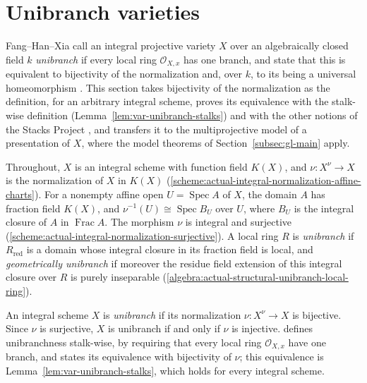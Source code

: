 \section{Unibranch varieties}\label{sec:var-unibranch}

Fang--Han--Xia call an integral projective variety $X$ over an algebraically closed field $k$
\emph{unibranch} if every local ring $\mathcal O_{X,x}$ has one branch, and state that this is
equivalent to bijectivity of the normalization \cite[Tags~0C37, 0C3B]{Stacks} and, over $k$, to
its being a universal homeomorphism \cite[\S1.1 and Lemma~8.1]{FHX}. This section takes
bijectivity of the normalization as the definition, for an arbitrary integral scheme, proves its
equivalence with the stalk-wise definition (Lemma~\ref{lem:var-unibranch-stalks}) and with the
other notions of the Stacks Project \cite[Tags~0BPZ, 0BQ2, 0C37, 0C3B]{Stacks}, and transfers it
to the multiprojective model of a presentation of $X$, where the model theorems of
Section~\ref{subsec:gl-main} apply.

Throughout, $X$ is an integral scheme with function field $K(X)$, and $\nu\colon X^\nu\to X$ is
the normalization of $X$ in $K(X)$
(\ref{scheme:actual-integral-normalization-affine-charts}). For a nonempty affine open
$U=\operatorname{Spec}A$ of $X$, the domain $A$ has fraction field $K(X)$, and
$\nu^{-1}(U)\cong\operatorname{Spec}B_U$ over $U$, where $B_U$ is the integral closure of $A$ in
$\operatorname{Frac}A$. The morphism $\nu$ is integral and surjective
(\ref{scheme:actual-integral-normalization-surjective}). A local ring $R$ is \emph{unibranch} if
$R_{\mathrm{red}}$ is a domain whose integral closure in its fraction field is local, and
\emph{geometrically unibranch} if moreover the residue field extension of this integral closure
over $R$ is purely inseparable (\ref{algebra:actual-structural-unibranch-local-ring}).

\begin{definition}\label{def:var-unibranch}
\leanok
{}
An integral scheme $X$ is \emph{unibranch} if its normalization $\nu\colon X^\nu\to X$ is
bijective. Since $\nu$ is surjective, $X$ is unibranch if and only if $\nu$ is injective.
\cite[\S1.1]{FHX} defines unibranchness stalk-wise, by requiring that every local ring
$\mathcal O_{X,x}$ have one branch, and states its equivalence with bijectivity of $\nu$; this
equivalence is Lemma~\ref{lem:var-unibranch-stalks}, which holds for every integral scheme.
\end{definition}

